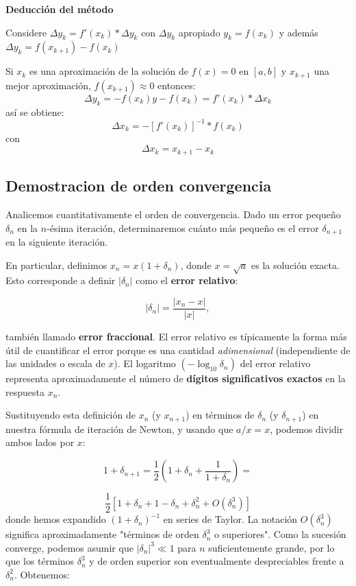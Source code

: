 \documentclass[conference]{IEEEtran}
\begin{document}
\textbf{Deducción del método}

Considere \( \Delta y_k = f'(x_k)*\Delta y_k\) con \( \Delta y_k\) apropiado \(  y_k = f(x_k)\) y además \( \Delta y_k = f(x_{k+1}) - f(x_k)\) 

Si \(  x_k\) es una aproximación de la solución  de \( f(x) = 0 \) en \( [a,b]\) y \(  x_{k+1}\) una mejor aproximación, \( f(x_{k+1}) \approx 0\) entonces:
\[
 \Delta y_k = -f(x_k) y  -f(x_k)=f'(x_k)* \Delta x_k
\]
así se obtiene:
\[
 \Delta x_k = -[f'(x_k)]^{-1}*f(x_k)
\]
con 
\[
\Delta x_k = x_{k+1} -x_k
\]

\subsection{Demostracion de orden convergencia}

Analicemos cuantitativamente el orden de convergencia. Dado un error pequeño $\delta_{n}$ en la $n$-ésima iteración, determinaremos cuánto más pequeño es el error $\delta_{n+1}$ en la siguiente iteración.

En particular, definimos $x_{n}=x(1+\delta_{n})$, donde $x=\sqrt{a}$ es la solución exacta. Esto corresponde a definir $|\delta_{n}|$ como el \textbf{error relativo}:

\[
|\delta_{n}|=\frac{|x_{n}-x|}{|x|},
\]

también llamado \textbf{error fraccional}. El error relativo es típicamente la forma más útil de cuantificar el error porque es una cantidad \textit{adimensional} (independiente de las unidades o escala de $x$). El logaritmo $(-\log_{10}\delta_{n})$ del error relativo representa aproximadamente el número de \textbf{dígitos significativos exactos} en la respuesta $x_{n}$.

Sustituyendo esta definición de $x_{n}$ (y $x_{n+1}$) en términos de $\delta_{n}$ (y $\delta_{n+1}$) en nuestra fórmula de iteración de Newton, y usando que $a/x = x$, podemos dividir ambos lados por $x$:

\[
1+\delta_{n+1}=\frac{1}{2}\left(1+\delta_{n}+\frac{1}{1+\delta_{n}}\right)=
\]

\[
\frac{1}{2}\left[1+\delta_{n}+1-\delta_{n}+\delta_{n}^{2}+O(\delta_{n}^{3})\right]
\]
donde hemos expandido $(1+\delta_{n})^{-1}$ en series de Taylor. La notación $O(\delta_{n}^{3})$ significa aproximadamente "términos de orden $\delta_{n}^{3}$ o superiores". Como la sucesión converge, podemos asumir que $|\delta_{n}|^{3} \ll 1$ para $n$ suficientemente grande, por lo que los términos $\delta_{n}^{3}$ y de orden superior son eventualmente despreciables frente a $\delta_{n}^{2}$. Obtenemos:
\end{document}
